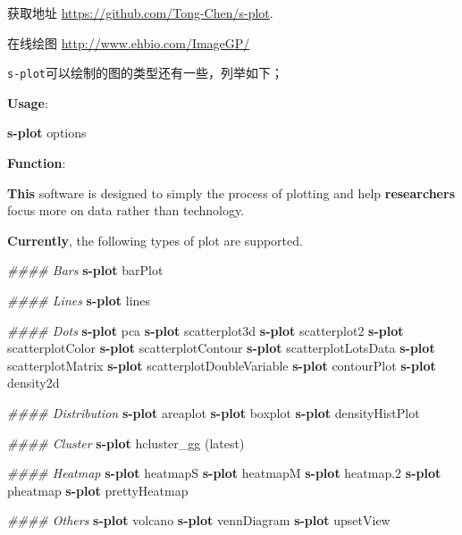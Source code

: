 \documentclass[]{article}
\newenvironment{Shaded}{\begin{snugshade}}{\end{snugshade}}
\newcommand{\KeywordTok}[1]{\textcolor[rgb]{0.13,0.29,0.53}{\textbf{{#1}}}}
\newcommand{\CommentTok}[1]{\textcolor[rgb]{0.56,0.35,0.01}{\textit{{#1}}}}
\newcommand{\NormalTok}[1]{{#1}}
\numberwithin{figure}{section}
\numberwithin{table}{section}
\theoremstyle{definition}
\theoremstyle{definition}
\theoremstyle{definition}
\theoremstyle{remark}
\begin{document}
获取地址 \url{https://github.com/Tong-Chen/s-plot}.

在线绘图 \url{http://www.ehbio.com/ImageGP/}

\texttt{s-plot}可以绘制的图的类型还有一些，列举如下；

\begin{Shaded}
\begin{Highlighting}[]
\KeywordTok{Usage}\NormalTok{:}

\KeywordTok{s-plot} \NormalTok{options}

\KeywordTok{Function}\NormalTok{:}

\KeywordTok{This} \NormalTok{software is designed to simply the process of plotting and help}
\KeywordTok{researchers} \NormalTok{focus more on data rather than technology.}

\KeywordTok{Currently}\NormalTok{, the following types of plot are supported.}

\CommentTok{#### Bars}
\KeywordTok{s-plot} \NormalTok{barPlot}

\CommentTok{#### Lines}
\KeywordTok{s-plot} \NormalTok{lines}

\CommentTok{#### Dots}
\KeywordTok{s-plot} \NormalTok{pca}
\KeywordTok{s-plot} \NormalTok{scatterplot3d}
\KeywordTok{s-plot} \NormalTok{scatterplot2}
\KeywordTok{s-plot} \NormalTok{scatterplotColor}
\KeywordTok{s-plot} \NormalTok{scatterplotContour}
\KeywordTok{s-plot} \NormalTok{scatterplotLotsData}
\KeywordTok{s-plot} \NormalTok{scatterplotMatrix}
\KeywordTok{s-plot} \NormalTok{scatterplotDoubleVariable}
\KeywordTok{s-plot} \NormalTok{contourPlot}
\KeywordTok{s-plot} \NormalTok{density2d}

\CommentTok{#### Distribution}
\KeywordTok{s-plot} \NormalTok{areaplot}
\KeywordTok{s-plot} \NormalTok{boxplot}
\KeywordTok{s-plot} \NormalTok{densityHistPlot}

\CommentTok{#### Cluster}
\KeywordTok{s-plot} \NormalTok{hcluster_gg (latest)}

\CommentTok{#### Heatmap}
\KeywordTok{s-plot} \NormalTok{heatmapS}
\KeywordTok{s-plot} \NormalTok{heatmapM}
\KeywordTok{s-plot} \NormalTok{heatmap.2}
\KeywordTok{s-plot} \NormalTok{pheatmap}
\KeywordTok{s-plot} \NormalTok{prettyHeatmap}

\CommentTok{#### Others}
\KeywordTok{s-plot} \NormalTok{volcano}
\KeywordTok{s-plot} \NormalTok{vennDiagram}
\KeywordTok{s-plot} \NormalTok{upsetView}
\end{Highlighting}
\end{Shaded}
\end{document}

